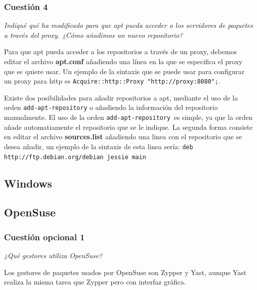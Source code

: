 \subsubsection{Cuestión 4}
\textit{Indiqué qué ha modificado para que apt pueda acceder a los servidores de paquetes a través del proxy. ¿Cómo añadimos un nuevo repositorio?}
\newline

Para que apt pueda acceder a los repositorios a través de un proxy, debemos editar el archivo \textbf{apt.conf} añadiendo una línea en la que se especifica el proxy que se quiere usar. Un ejemplo de la sintaxis que se puede usar para configurar un proxy para http es \cite{aptpx2}  \texttt{Acquire::http::Proxy "http://proxy:8080";}. \cite{aptpx1} 

Existe dos posibilidades para añadir repositorios a apt, mediante el uso de la orden \texttt{add-apt-repository} \cite{aptadd1} o añadiendo la información del repositorio manualmente\cite{aptadd2}. El uso de la orden \texttt{add-apt-repository }es simple, ya que la orden añade automatiamente el repositorio que se le indique. La segunda forma consiste en editar el archivo \textbf{sources.list }añadiendo una linea con el repositorio que se desea añadir, un ejemplo de la sintaxis de esta linea sería:  \texttt{deb http://ftp.debian.org/debian jessie main
}
\subsection{Windows}

\subsection{OpenSuse}


\subsubsection{Cuestión opcional 1}
\textit{¿Qué gestores utiliza OpenSuse?}
\newline
 
Los gestores de paquetes usados por OpenSuse son Zypper y Yast, aunque Yast realiza la misma tarea que Zypper pero con interfaz gráfica. \cite{os1} \cite{os2} \cite{os3}





